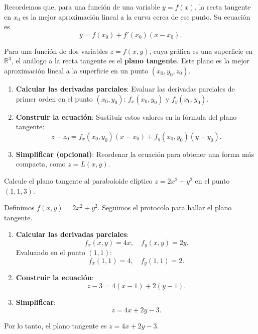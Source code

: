 Recordemos que, para una función de una variable $y=f(x)$, la recta tangente en $x_0$ es la mejor aproximación lineal a la curva cerca de ese punto. Su ecuación es
\[
y = f(x_0) + f'(x_0)(x-x_0).
\]

Para una función de dos variables $z=f(x,y)$, cuya gráfica es una superficie en $\mathbb{R}^3$, el análogo a la recta tangente es el \textbf{plano tangente}. Este plano es la mejor aproximación lineal a la superficie en un punto $(x_0, y_0, z_0)$.

\begin{pasos}[Protocolo para hallar el plano tangente a una superficie $z=f(x,y)$ en un punto $(x_0, y_0, f(x_0, y_0))$]
\begin{enumerate}
    \item \textbf{Calcular las derivadas parciales}: Evaluar las derivadas parciales de primer orden en el punto $(x_0, y_0)$: $f_x(x_0, y_0)$ y $f_y(x_0, y_0)$.
    \item \textbf{Construir la ecuación}: Sustituir estos valores en la fórmula del plano tangente:
    \[
    z - z_0 = f_x(x_0, y_0)(x - x_0) + f_y(x_0, y_0)(y - y_0).
    \]
    \item \textbf{Simplificar (opcional)}: Reordenar la ecuación para obtener una forma más compacta, como $z = L(x, y)$.
\end{enumerate}
\end{pasos}

\begin{example}
Calcule el plano tangente al paraboloide elíptico $z = 2x^2 + y^2$ en el punto $(1, 1, 3)$.
\end{example}
\begin{myproof}
Definimos $f(x, y) = 2x^2 + y^2$. Seguimos el protocolo para hallar el plano tangente.

\begin{enumerate}
    \item \textbf{Calcular las derivadas parciales}:
    \[
    f_x(x, y) = 4x, \quad f_y(x, y) = 2y.
    \]
    Evaluando en el punto $(1, 1)$:
    \[
    f_x(1, 1) = 4, \quad f_y(1, 1) = 2.
    \]

    \item \textbf{Construir la ecuación}:
    \[
    z - 3 = 4(x - 1) + 2(y - 1).
    \]

    \item \textbf{Simplificar}:
    \[
    z = 4x + 2y - 3.
    \]
\end{enumerate}
Por lo tanto, el plano tangente es $\boxed{z = 4x + 2y - 3}$.
\end{myproof}

